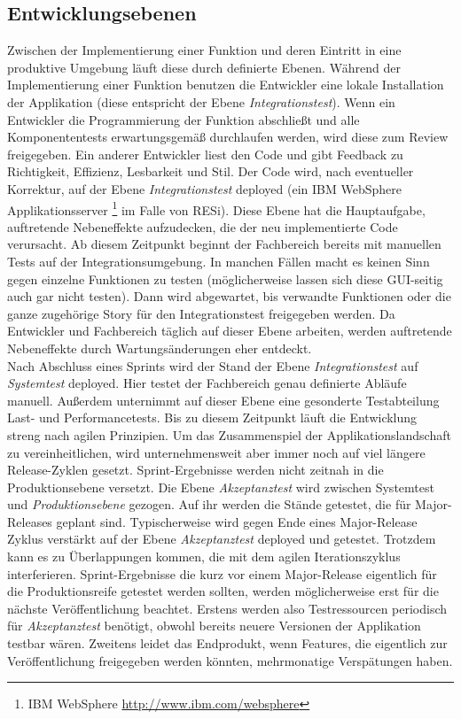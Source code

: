 \subsection{Entwicklungsebenen}
Zwischen der Implementierung einer Funktion und deren Eintritt in eine produktive Umgebung läuft diese durch definierte Ebenen. Während der Implementierung einer Funktion benutzen die Entwickler eine lokale Installation der Applikation (diese entspricht der Ebene \textit{Integrationstest}). Wenn ein Entwickler die Programmierung der Funktion abschließt und alle Komponententests erwartungsgemäß durchlaufen werden, wird diese zum \gls{Review} freigegeben. Ein anderer Entwickler liest den Code und gibt Feedback zu Richtigkeit, Effizienz, Lesbarkeit und Stil. Der Code wird, nach eventueller Korrektur, auf der Ebene \textit{Integrationstest} deployed (ein IBM WebSphere Applikationsserver \footnote{IBM WebSphere \url{http://www.ibm.com/websphere}} im Falle von RESi). Diese Ebene hat die Hauptaufgabe, auftretende Nebeneffekte aufzudecken, die der neu implementierte Code verursacht. Ab diesem Zeitpunkt beginnt der Fachbereich bereits mit manuellen Tests auf der Integrationsumgebung. In manchen Fällen macht es keinen Sinn gegen einzelne Funktionen zu testen (möglicherweise lassen sich diese GUI-seitig auch gar nicht testen). Dann wird abgewartet, bis verwandte Funktionen oder die ganze zugehörige Story für den Integrationstest freigegeben werden. Da Entwickler und Fachbereich täglich auf dieser Ebene arbeiten, werden auftretende Nebeneffekte durch Wartungsänderungen eher entdeckt.\\
Nach Abschluss eines Sprints wird der Stand der Ebene \textit{Integrationstest} auf \textit{Systemtest} deployed. Hier testet der Fachbereich genau definierte Abläufe manuell. Außerdem unternimmt auf dieser Ebene eine gesonderte Testabteilung Last- und Performancetests. Bis zu diesem Zeitpunkt läuft die Entwicklung streng nach agilen Prinzipien. Um das Zusammenspiel der Applikationslandschaft zu vereinheitlichen, wird unternehmensweit aber immer noch auf viel längere Release-Zyklen gesetzt. Sprint-Ergebnisse werden nicht zeitnah in die Produktionsebene versetzt. Die Ebene \textit{Akzeptanztest} wird zwischen Systemtest und \textit{Produktionsebene} gezogen. Auf ihr werden die Stände getestet, die für Major-Releases geplant sind. Typischerweise wird gegen Ende eines Major-Release Zyklus verstärkt auf der Ebene \textit{Akzeptanztest} deployed und getestet. Trotzdem kann es zu Überlappungen kommen, die mit dem agilen Iterationszyklus interferieren. Sprint-Ergebnisse die kurz vor einem Major-Release eigentlich für die Produktionsreife getestet werden sollten, werden möglicherweise erst für die nächste Veröffentlichung beachtet. Erstens werden also Testressourcen periodisch für \textit{Akzeptanztest} benötigt, obwohl bereits neuere Versionen der Applikation testbar wären. Zweitens leidet das Endprodukt, wenn Features, die eigentlich zur Veröffentlichung freigegeben werden könnten, mehrmonatige Verspätungen haben.

